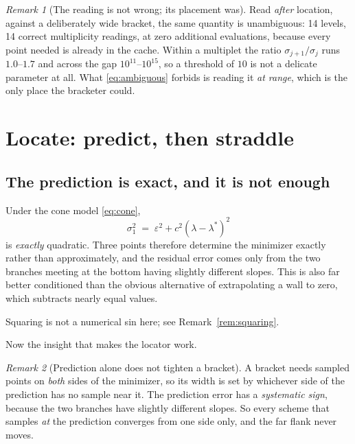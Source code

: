 \documentclass[11pt]{article}
\theoremstyle{definition}
\theoremstyle{remark}
\newtheorem{remark}{Remark}
\newcommand{\lam}{\lambda}
\newcommand{\sig}{\sigma}
\begin{document}
\begin{remark}[The reading is not wrong; its placement was]
Read \emph{after} location, against a deliberately wide bracket, the same quantity is
unambiguous: 14 levels, 14 correct multiplicity readings, at zero additional evaluations,
because every point needed is already in the cache. Within a multiplet the ratio
$\sig_{j+1}/\sig_j$ runs $1.0$--$1.7$ and across the gap $10^{11}$--$10^{15}$, so a threshold of
$10$ is not a delicate parameter at all. What \eqref{eq:ambiguous} forbids is reading it
\emph{at range}, which is the only place the bracketer could.
\end{remark}

\section{Locate: predict, then straddle}
\label{sec:locate}

\subsection{The prediction is exact, and it is not enough}

Under the cone model \eqref{eq:cone},
\begin{equation}\label{eq:quad}
  \sig_1^2 \;=\; \varepsilon^2 + c^2(\lam-\lam^*)^2
\end{equation}
is \emph{exactly} quadratic. Three points therefore determine the minimizer exactly rather than
approximately, and the residual error comes only from the two branches meeting at the bottom
having slightly different slopes. This is also far better conditioned than the obvious
alternative of extrapolating a wall to zero, which subtracts nearly equal values.

Squaring is not a numerical sin here; see Remark~\ref{rem:squaring}.

Now the insight that makes the locator work.

\begin{remark}[Prediction alone does not tighten a bracket]
\label{rem:straddle}
A bracket needs sampled points on \emph{both} sides of the minimizer, so its width is set by
whichever side of the prediction has no sample near it. The prediction error has a
\emph{systematic sign}, because the two branches have slightly different slopes. So every
scheme that samples \emph{at} the prediction converges from one side only, and the far flank
never moves.
\end{remark}
\end{document}
